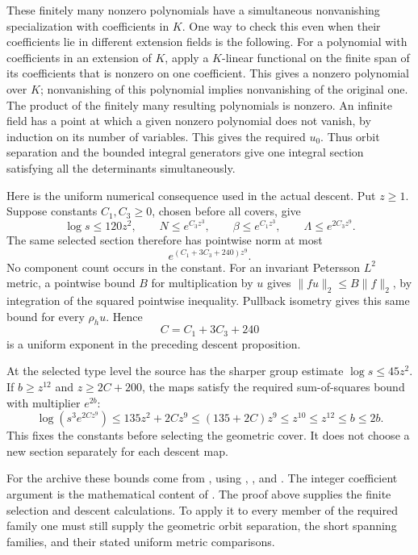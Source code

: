 These finitely many nonzero polynomials have a simultaneous
nonvanishing specialization with coefficients in \(K\).
One way to check this even when their coefficients lie in different
extension fields is the following.  For a polynomial with coefficients
in an extension of \(K\), apply a \(K\)-linear functional on the
finite span of its coefficients that is nonzero on one coefficient.
This gives a nonzero polynomial over \(K\); nonvanishing of this
polynomial implies nonvanishing of the original one.
The product of the finitely many resulting polynomials is nonzero.
An infinite field has a point at which a given nonzero polynomial
does not vanish, by induction on its number of variables.
This gives the required \(u_0\).  Thus orbit separation and the
bounded integral generators give one integral section satisfying
all the determinants simultaneously.

Here is the uniform numerical consequence used in the actual descent.
Put \(z\geq1\).  Suppose constants \(C_1,C_3\geq0\), chosen before
all covers, give
\[
 \log s\leq120z^2,\qquad
 N\leq e^{C_3z^3},\qquad \beta\leq e^{C_1z^3},\qquad
                        \Lambda\leq e^{2C_3z^9}.
\]
The same selected section therefore has pointwise norm at most
\[
                         e^{(C_1+3C_3+240)z^9}.
\]
No component count occurs in the constant.
For an invariant Petersson \(L^2\) metric, a pointwise bound \(B\)
for multiplication by \(u\) gives
\(\|f u\|_2\leq B\|f\|_2\), by integration of the squared
pointwise inequality.  Pullback isometry gives this same bound for
every \(\rho_hu\).  Hence
\[
                         C=C_1+3C_3+240
\]
is a uniform exponent in the preceding descent proposition.

At the selected type level the source has the sharper group estimate
\(\log s\leq45z^2\).
If \(b\geq z^{12}\) and \(z\geq2C+200\), the maps satisfy the
required sum-of-squares bound with multiplier \(e^{2b}\):
\[
 \log(s^3e^{2Cz^9})
       \leq135z^2+2Cz^9
       \leq(135+2C)z^9
       \leq z^{10}\leq z^{12}\leq b\leq2b .
\]
This fixes the constants before selecting the geometric cover.
It does not choose a new section separately for each descent map.

For the archive these bounds come from
,
using ,
,
 and
.
The integer coefficient argument is the mathematical content of
.
The proof above supplies the finite selection and descent calculations.
To apply it to every member of the required family one must still
supply the geometric orbit separation, the short spanning families,
and their stated uniform metric comparisons.

